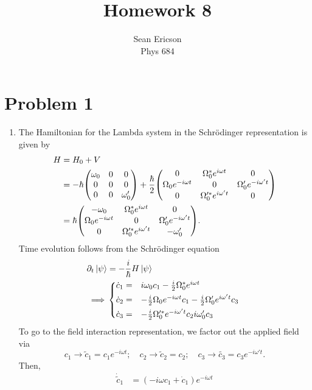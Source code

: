 \documentclass[12pt]{article}
\begin{document}
	
\title{Homework 8}
\author{Sean Ericson \\ Phys 684}
\maketitle

\section*{Problem 1}
\begin{enumerate}[label=(\alph*)]
    \item The Hamiltonian for the Lambda system in the Schr\"odinger representation is given by
    \begin{align*}
        H &= H_0 + V \\
        &= -\hbar\mqty(\omega_0&0&0\\0&0&0\\0&0&\omega_0') + \frac{\hbar}{2}\mqty(0&\Omega_0^*e^{i\omega t}&0\\\Omega_0e^{-i\omega t}&0&\Omega_0'e^{-i\omega' t}\\0&\Omega_0'^*e^{i\omega't}&0) \\
        &= \hbar\mqty(-\omega_0&\Omega_0^*e^{i\omega t}&0\\\Omega_0e^{-i\omega t}&0&\Omega_0'e^{-i\omega' t}\\0&\Omega_0'^*e^{i\omega't}&-\omega_0').
    \end{align*}
    Time evolution follows from the Schr\"odinger equation
    \begin{align*}
        \partial_t\ket{\psi} &= -\frac{i}{\hbar}H\ket{\psi} \\
        \implies& \begin{cases*}
            \dot{c}_1 =& $i\omega_0c_1 - \frac{i}{2}\Omega_0^*e^{i\omega t}$ \\
            \dot{c}_2 =& $-\frac{i}{2}\Omega_0e^{-i\omega t}c_1 - \frac{i}{2}\Omega_0'e^{i\omega't}c_3$ \\
            \dot{c}_3 =& $-\frac{i}{2}\Omega_0'^*e^{-i\omega't}c_2 i\omega_0'c_3$
        \end{cases*}
    \end{align*}
    To go to the field interaction representation, we factor out the applied field via
    \[ c_1 \to \tilde{c}_1 = c_1e^{-i\omega t}; \quad c_2 \to \tilde{c}_2 = c_2; \quad c_3 \to \tilde{c_3} = c_3e^{-i\omega't}. \]
    Then,
    \begin{align*}
        \dot{\tilde{c}}_1 &= \left(-i\omega c_1 + \dot{c}_1\right)e^{-i\omega t} \\

\end{align*}
\end{enumerate}
\end{document}
